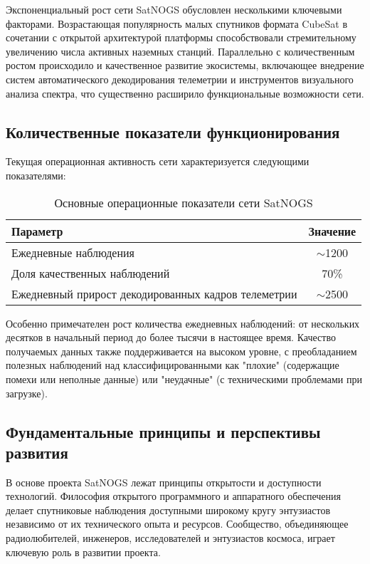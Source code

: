 Экспоненциальный рост сети SatNOGS обусловлен несколькими ключевыми факторами.
Возрастающая популярность малых спутников формата CubeSat в сочетании с
открытой архитектурой платформы способствовали стремительному увеличению числа
активных наземных станций. Параллельно с количественным ростом происходило и
качественное развитие экосистемы, включающее внедрение систем автоматического
декодирования телеметрии и инструментов визуального анализа спектра, что
существенно расширило функциональные возможности сети.

\subsection{Количественные показатели функционирования}

Текущая операционная активность сети характеризуется следующими показателями:

\begin{table}[htbp]
	\centering
	\begin{tabular}{|l|c|}
		\hline
		\textbf{Параметр}                                   & \textbf{Значение} \\
		\hline
		Ежедневные наблюдения                               & $\sim$1200        \\
		Доля качественных наблюдений                        & 70\%              \\
		Ежедневный прирост декодированных кадров телеметрии & $\sim$2500        \\
		\hline
	\end{tabular}
	\caption{Основные операционные показатели сети SatNOGS}
	\label{tab:satnogs_stats}
\end{table}

Особенно примечателен рост количества ежедневных наблюдений: от нескольких
десятков в начальный период до более тысячи в настоящее время. Качество
получаемых данных также поддерживается на высоком уровне, с преобладанием
полезных наблюдений над классифицированными как "плохие" (содержащие помехи или
неполные данные) или "неудачные" (с техническими проблемами при загрузке).

\subsection{Фундаментальные принципы и перспективы развития}

В основе проекта SatNOGS лежат принципы открытости и доступности технологий.
Философия открытого программного и аппаратного обеспечения делает спутниковые
наблюдения доступными широкому кругу энтузиастов независимо от их технического
опыта и ресурсов. Сообщество, объединяющее радиолюбителей, инженеров,
исследователей и энтузиастов космоса, играет ключевую роль в развитии проекта.

